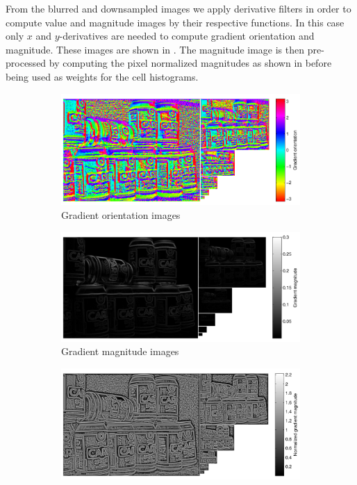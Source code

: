 \documentclass[thesis.tex]{subfiles}
\begin{document}
From the blurred and downsampled images we apply derivative filters in order to compute value and magnitude images by their respective functions. In this case only $x$ and $y$-derivatives are needed to compute gradient orientation and magnitude. These images are shown in . The magnitude image is then pre-processed by computing the pixel normalized magnitudes as shown in  before being used as weights for the cell histograms.
%
\begin{figure}[p]
    \centering
    \begin{subfigure}[t]{0.97\textwidth}
		\includegraphics[width=\textwidth]{img/cellHistScaleSpacesV.pdf}
    	\caption{Gradient orientation images}
    	\label{fig:cellHistScaleSpacesV}
	\end{subfigure}
    \begin{subfigure}[t]{0.97\textwidth}
		\includegraphics[width=\textwidth]{img/cellHistScaleSpacesM.pdf}
    	\caption{Gradient magnitude images}
    	\label{fig:cellHistScaleSpacesM}
	\end{subfigure}
	\begin{subfigure}[t]{0.97\textwidth}
		\includegraphics[width=\textwidth]{img/cellHistScaleSpacesMnorm.pdf}

\end{subfigure}
\end{figure}
\end{document}
